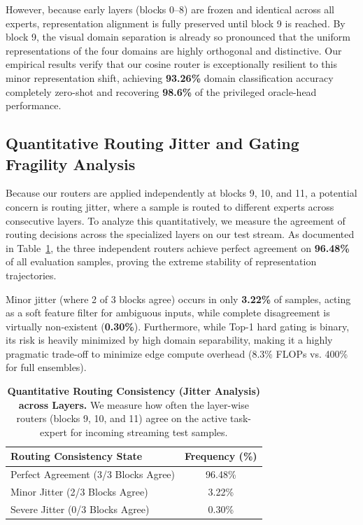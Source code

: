 \documentclass{article}
\theoremstyle{plain}
\theoremstyle{definition}
\theoremstyle{remark}
\begin{document}
However, because early layers (blocks 0--8) are frozen and identical across all experts, representation alignment is fully preserved until block 9 is reached. By block 9, the visual domain separation is already so pronounced that the uniform representations of the four domains are highly orthogonal and distinctive. Our empirical results verify that our cosine router is exceptionally resilient to this minor representation shift, achieving \textbf{93.26\%} domain classification accuracy completely zero-shot and recovering \textbf{98.6\%} of the privileged oracle-head performance.

\subsection{Quantitative Routing Jitter and Gating Fragility Analysis}
\label{sec:appendix_jitter}
Because our routers are applied independently at blocks 9, 10, and 11, a potential concern is routing jitter, where a sample is routed to different experts across consecutive layers. To analyze this quantitatively, we measure the agreement of routing decisions across the specialized layers on our test stream. As documented in Table~\ref{tab:routing_jitter_app}, the three independent routers achieve perfect agreement on \textbf{96.48\%} of all evaluation samples, proving the extreme stability of representation trajectories. 

Minor jitter (where 2 of 3 blocks agree) occurs in only \textbf{3.22\%} of samples, acting as a soft feature filter for ambiguous inputs, while complete disagreement is virtually non-existent (\textbf{0.30\%}). Furthermore, while Top-1 hard gating is binary, its risk is heavily minimized by high domain separability, making it a highly pragmatic trade-off to minimize edge compute overhead (8.3\% FLOPs vs. 400\% for full ensembles).

\begin{table}[h]
\caption{\textbf{Quantitative Routing Consistency (Jitter Analysis) across Layers.} We measure how often the layer-wise routers (blocks 9, 10, and 11) agree on the active task-expert for incoming streaming test samples.}
\label{tab:routing_jitter_app}
\vskip 0.1in
\begin{center}
\begin{small}
\begin{sc}
\begin{tabular}{lc}
\toprule
Routing Consistency State & Frequency (\%) \\
\midrule
Perfect Agreement (3/3 Blocks Agree) & 96.48\% \\
Minor Jitter (2/3 Blocks Agree)      & 3.22\% \\
Severe Jitter (0/3 Blocks Agree)     & 0.30\% \\
\bottomrule
\end{tabular}
\end{sc}
\end{small}
\end{center}
\vskip -0.1in
\end{table}
\end{document}
